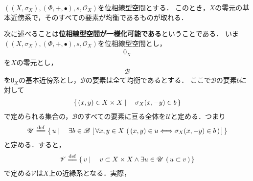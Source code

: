 	\begin{screen}
		\begin{thm}[均衡な局所基が取れる]
			$\left(\left(X,\sigma_X\right),(\Phi,+,\bullet),s,\mathscr{O}_X\right)$を位相線型空間とする．
			このとき，$X$の零元の基本近傍系で，そのすべての要素が均衡であるものが取れる．
		\end{thm}
	\end{screen}
	
	\begin{sketch}
		
	\end{sketch}
	
	次に述べることは{\bf 位相線型空間が一様化可能である}ということである．
	いま$\left(\left(X,\sigma_X\right),(\Phi,+,\bullet),s,\mathscr{O}_X\right)$を位相線型空間とし，
	\begin{align}
		0_X
	\end{align}
	を$X$の零元とし，
	\begin{align}
		\mathscr{B}
	\end{align}
	を$0_X$の基本近傍系とし，$\mathscr{B}$の要素は全て均衡であるとする．
	ここで$\mathscr{B}$の要素$b$に対して
	\begin{align}
		\left\{\, (x,y) \in X \times X \mid \quad \sigma_X(x,-y) \in b\, \right\}
	\end{align}
	で定められる集合の，$\mathscr{B}$のすべての要素に亘る全体を$\mathscr{U}$と定める．つまり
	\begin{align}
		\mathscr{U} \defeq \Set{u}{\exists b \in \mathscr{B}\,
		\left[\, \forall x,y \in X\, \left(\, (x,y) \in u \Longleftrightarrow\sigma_X(x,-y) \in b\, \right)\, \right]}
	\end{align}
	と定める．すると，
	\begin{align}
		\mathscr{V} \defeq \Set{v}{v \subset X \times X \wedge \exists u \in \mathscr{U}\,
		\left(\, u \subset v\, \right)}
	\end{align}
	で定める$\mathscr{V}$は$X$上の近縁系となる．実際，
